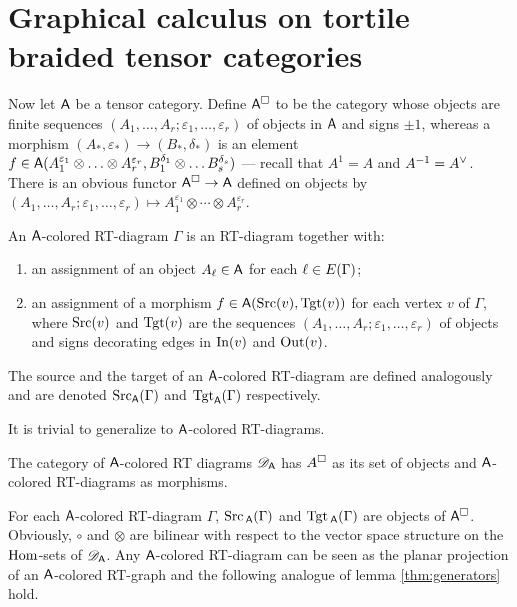 \section{Graphical calculus on tortile braided tensor categories}
\label{sec:rt-gc}
Now let $\A$ be a tensor category. Define $\freemsc{\A}$ to be the
category whose objects are finite sequences $(A_1, \ldots, A_r; \varepsilon_1, \ldots,
\varepsilon_r)$ of objects in $\A$ and signs $\pm1$, whereas a morphism $(A_*,
\varepsilon_*) \to (B_*, \delta_*)$ is an element $f \in \A(A_1^{\varepsilon_1} \otimes \ldots \otimes
A_r^{\varepsilon_r}, B_1^{\delta_1} \otimes \ldots B_s^{\delta_s})$ --- recall that $A^1 = A$
and $A^{-1} = \rdl{A}$.  There is an obvious functor $\freemsc{\A} \to
\A$ defined on objects by $(A_1, \ldots, A_r; \varepsilon_1, \ldots, \varepsilon_r) \mapsto
A_1^{\varepsilon_1} \otimes \cdots \otimes A_r^{\varepsilon_r}$.
\begin{definition}
  An $\A$-colored RT-diagram $\Gamma$ is an RT-diagram together with:
  \begin{enumerate}
  \item an assignment of an object $A_\ell \in \A$ for each
    $\ell\in\Edges{\Gamma}$;
  \item an assignment of a morphism $f\in\A(\Src(v),\Tgt(v))$ for each
    vertex $v$ of $\Gamma$, where $\Src(v)$ and $\Tgt(v)$ are the
    sequences $(A_1, \ldots, A_r;\varepsilon_1, \ldots, \varepsilon_r)$ of objects and signs
    decorating edges in $\In(v)$ and $\Out(v)$.
  \end{enumerate}
  The source and the target of an $\A$-colored RT-diagram are defined
  analogously and are denoted $\Src_\A(\Gamma)$ and $\Tgt_\A(\Gamma)$ respectively.
\end{definition}
It is trivial to generalize  to
$\A$-colored RT-diagrams.
\begin{definition}
  The category of $\A$-colored RT diagrams $\RTD[\A]$  has
  $\freemsc{A}$ as its set of objects and $\A$-colored RT-diagrams as
  morphisms. 
\end{definition}
For each $\A$-colored RT-diagram $\Gamma$, $\Src{}_{\A}(\Gamma)$ and
$\Tgt{}_{\A}(\Gamma)$ are objects of $\freemsc{\A}$.  Obviously, $\circ$ and
$\otimes$ are bilinear with respect to the vector space structure on the
$\Hom$-sets of $\RTD[\A]$. Any $\A$-colored RT-diagram can be seen as
the planar projection of an $\A$-colored RT-graph and the following
analogue of lemma \ref{thm:generators} hold.
